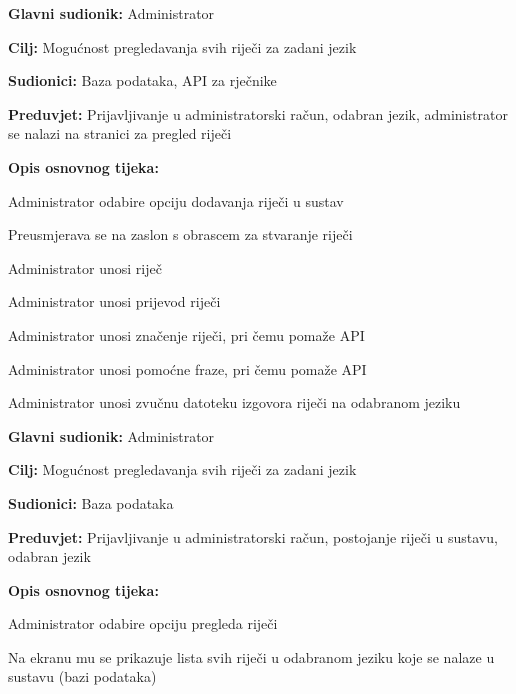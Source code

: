 \noindent {}
\begin{packed_item}

	\item \textbf{Glavni sudionik: } Administrator
	\item \textbf{Cilj: } Mogućnost pregledavanja svih riječi za zadani jezik
	\item \textbf{Sudionici: } Baza podataka, API za rječnike
	\item \textbf{Preduvjet: } Prijavljivanje u administratorski račun, odabran jezik, administrator se nalazi na stranici za pregled riječi	
	\item  \textbf{Opis osnovnog tijeka:}
	
	\item[] \begin{packed_enum}
		
		\item Administrator odabire opciju dodavanja riječi u sustav
		\item Preusmjerava se na zaslon s obrascem za stvaranje riječi
		\item Administrator unosi riječ
		\item Administrator unosi prijevod riječi
		\item Administrator unosi značenje riječi, pri čemu pomaže API
		\item Administrator unosi pomoćne fraze, pri čemu pomaže API
		\item Administrator unosi zvučnu datoteku izgovora riječi na odabranom jeziku

	\end{packed_enum}
	
\end{packed_item}

\noindent {}
\begin{packed_item}

	\item \textbf{Glavni sudionik: } Administrator
	\item \textbf{Cilj: } Mogućnost pregledavanja svih riječi za zadani jezik
	\item \textbf{Sudionici: } Baza podataka
	\item \textbf{Preduvjet: } Prijavljivanje u administratorski račun, postojanje riječi u sustavu, odabran jezik
	\item  \textbf{Opis osnovnog tijeka:}
	
	\item[] \begin{packed_enum}
		
		\item Administrator odabire opciju pregleda riječi
		\item Na ekranu mu se prikazuje lista svih riječi u odabranom jeziku koje se nalaze u sustavu (bazi podataka)

	\end{packed_enum}
	
\end{packed_item}


